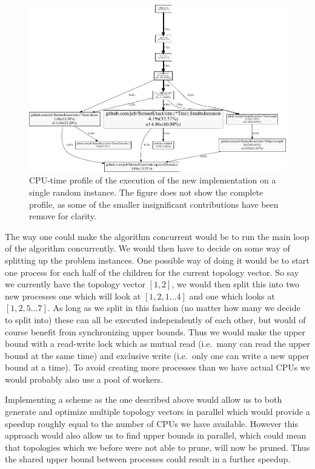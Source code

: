 \begin{figure}[htbp]
  \centering
  \includegraphics[width=\textwidth]{gfx/pprof001}
  \caption[CPU-time profile of a single execution]{CPU-time profile of the
    execution of the new implementation on a single random instance. The figure
    does not show the complete profile, as some of the smaller insignificant
    contributions have been remove for clarity.\label{fig:pprof}}
\end{figure}

The way one could make the algorithm concurrent would be to run the main loop of
the algorithm concurrently. We would then have to decide on some way of
splitting up the problem instances. One possible way of doing it would be to
start one process for each half of the children for the current topology vector.
So say we currently have the topology vector $[1, 2]$, we would then split this
into two new processes one which will look at $[1, 2, 1 \ldots 4]$ and one which looks
at $[1, 2, 5 \ldots 7]$. As long as we split in this fashion (no matter how many we
decide to split into) these can all be executed independently of each other, but
would of course benefit from synchronizing upper bounds. Thus we would make the
upper bound with a read-write lock which as mutual read (i.e.\ many can read the
upper bound at the same time) and exclusive write (i.e.\ only one can write a
new upper bound at a time). To avoid creating more processes than we have actual
CPUs we would probably also use a pool of workers.

Implementing a scheme as the one described above would allow us to both generate
and optimize multiple topology vectors in parallel which would provide a speedup
roughly equal to the number of CPUs we have available. However this approach
would also allow us to find upper bounds in parallel, which could mean that
topologies which we before were not able to prune, will now be pruned. Thus the
shared upper bound between processes could result in a further speedup.

